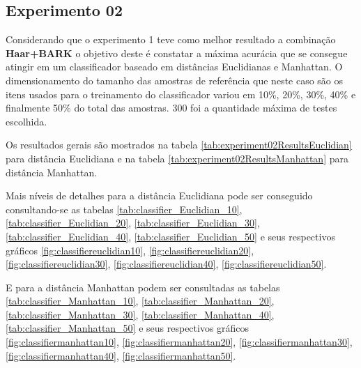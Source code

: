 \begin{myenv}{1.5}
		\newpage
		\section{Experimento 02}
			\par Considerando que o experimento 1 teve como melhor resultado a combinação \textbf{Haar+BARK} o objetivo deste é constatar a máxima acurácia que se consegue atingir em um classificador baseado em distâncias Euclidianas e Manhattan. O dimensionamento do tamanho das amostras de referência que neste caso são os itens usados para o treinamento do classificador variou em 10\%, 20\%, 30\%, 40\% e finalmente 50\% do total das amostras. 300 foi a quantidade máxima de testes escolhida.
			\par Os resultados gerais são mostrados na tabela \ref{tab:experiment02ResultsEuclidian} para distância Euclidiana e na tabela \ref{tab:experiment02ResultsManhattan} para distância Manhattan. 
			
			\par Mais níveis de detalhes para a distância Euclidiana pode ser conseguido consultando-se as tabelas \ref{tab:classifier_Euclidian_10}, \ref{tab:classifier_Euclidian_20}, \ref{tab:classifier_Euclidian_30}, \ref{tab:classifier_Euclidian_40},  \ref{tab:classifier_Euclidian_50} e seus respectivos gráficos \ref{fig:classifiereuclidian10}, \ref{fig:classifiereuclidian20}, \ref{fig:classifiereuclidian30}, \ref{fig:classifiereuclidian40}, \ref{fig:classifiereuclidian50}.
			
			\par E para a distância Manhattan podem ser consultadas as tabelas 	\ref{tab:classifier_Manhattan_10}, \ref{tab:classifier_Manhattan_20}, \ref{tab:classifier_Manhattan_30}, \ref{tab:classifier_Manhattan_40}, \ref{tab:classifier_Manhattan_50} e seus respectivos gráficos 		 
			 \ref{fig:classifiermanhattan10}, \ref{fig:classifiermanhattan20}, 	 \ref{fig:classifiermanhattan30}, \ref{fig:classifiermanhattan40},  \ref{fig:classifiermanhattan50}.
			
			

\end{myenv}
